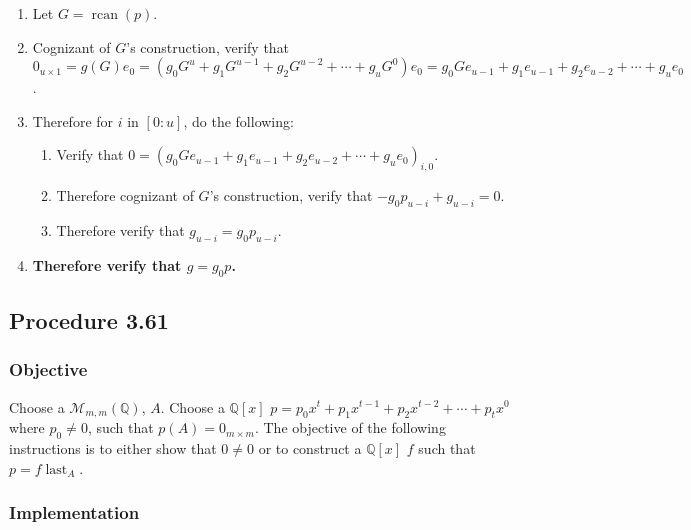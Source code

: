 \documentclass[twocolumn]{article}
\DeclareMathOperator{\rcan}{rcan}
\DeclareMathOperator{\last}{last}
\newcommand{\procedure}[2][]{\subsection*{Procedure #2 \ifthenelse{\equal{#1}{}}{}{(#1)}}\label{sec:procedure #2}}
\newcommand{\objective}{\subsubsection*{Objective}}
\newcommand{\implementation}{\subsubsection*{Implementation}}
\begin{document}
				\begin{enumerate}
					\item Let $G=\rcan(p)$.
					\item Cognizant of $G$'s construction, verify that $0_{u\times 1}=g(G)e_0=(g_0G^u+g_1G^{u-1}+g_2G^{u-2}+\cdots+g_uG^0)e_0=g_0Ge_{u-1}+g_1e_{u-1}+g_2e_{u-2}+\cdots+g_ue_0$.
					\item Therefore for $i$ in $[0:u]$, do the following:
					\begin{enumerate}
						\item Verify that $0=(g_0Ge_{u-1}+g_1e_{u-1}+g_2e_{u-2}+\cdots+g_ue_0)_{i,0}$.
						\item Therefore cognizant of $G$'s construction, verify that $-g_0p_{u-i}+g_{u-i}=0$.
						\item Therefore verify that $g_{u-i}=g_0p_{u-i}$.
					\end{enumerate}
					\item \textbf{Therefore verify that $g=g_0p$.}
				\end{enumerate}
		\procedure{3.61}
			\objective
				Choose a $\mathcal{M}_{m,m}(\mathbb{Q})$, $A$. Choose a $\mathbb{Q}[x]$ $p=p_0x^t+p_1x^{t-1}+p_2x^{t-2}+\cdots+p_tx^0$ where $p_0\ne 0$, such that $p(A)=0_{m\times m}$. The objective of the following instructions is to either show that $0\ne 0$ or to construct a $\mathbb{Q}[x]$ $f$ such that $p=f\last_A$.
			\implementation
\end{document}
